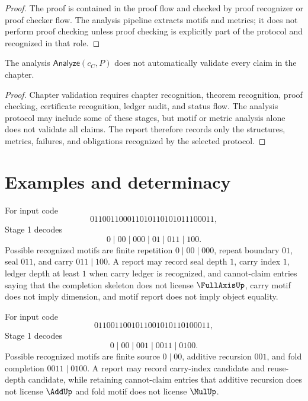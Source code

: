 \begin{proof}
The proof is contained in the proof flow and checked by proof recognizer or proof checker flow. The analysis pipeline extracts motifs and metrics; it does not perform proof checking unless proof checking is explicitly part of the protocol and recognized in that role.
\end{proof}

\begin{proposition}
\label{prop:analysis-pipeline-chapter-analysis-not-validation}
The analysis $\mathsf{Analyze}(c_C,P)$ does not automatically validate every claim in the chapter.
\end{proposition}

\begin{proof}
Chapter validation requires chapter recognition, theorem recognition, proof checking, certificate recognition, ledger audit, and status flow. The analysis protocol may include some of these stages, but motif or metric analysis alone does not validate all claims. The report therefore records only the structures, metrics, failures, and obligations recognized by the selected protocol.
\end{proof}

\section{Examples and determinacy}
\label{sec:analysis-pipeline-examples-determinacy}

\begin{example}
\label{ex:analysis-pipeline-completion-code}
For input code
$$
  011001100011010110101011100011,
$$
Stage 1 decodes
$$
  0\mid 00\mid 000\mid 01\mid 011\mid 100.
$$
Possible recognized motifs are finite repetition $0\mid 00\mid 000$, repeat boundary $01$, seal $011$, and carry $011\mid 100$. A report may record seal depth $1$, carry index $1$, ledger depth at least $1$ when carry ledger is recognized, and cannot-claim entries saying that the completion skeleton does not license $\FullAxisUp$, carry motif does not imply dimension, and motif report does not imply object equality.
\end{example}

\begin{example}
\label{ex:analysis-pipeline-fold-code}
For input code
$$
  0110011001011001010110100011,
$$
Stage 1 decodes
$$
  0\mid 00\mid 001\mid 0011\mid 0100.
$$
Possible recognized motifs are finite source $0\mid 00$, additive recursion $001$, and fold completion $0011\mid 0100$. A report may record carry-index candidate and reuse-depth candidate, while retaining cannot-claim entries that additive recursion does not license $\AddUp$ and fold motif does not license $\MulUp$.
\end{example}

